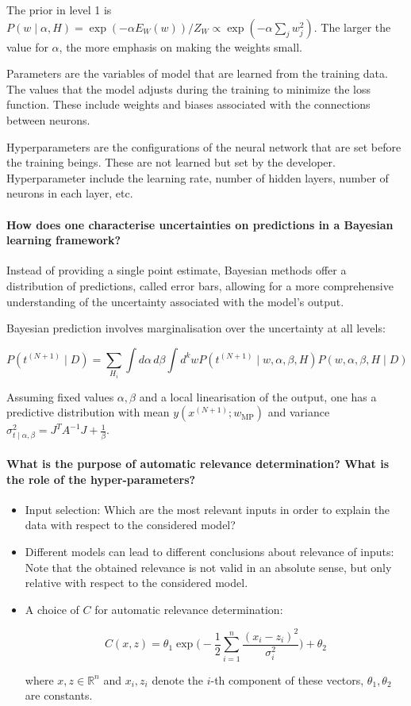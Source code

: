 The prior in level 1 is $P(w \mid \alpha, H) = \exp(- \alpha E_W(w) ) / Z_W \propto \exp(- \alpha \sum_j{w_j^2})$.
The larger the value for $\alpha$, the more emphasis on making the weights small.

Parameters are the variables of model that are learned from the training data. The values that the
model adjusts during the training to minimize the loss function. These include weights and biases
associated with the connections between neurons.

Hyperparameters are the configurations of the neural network that are set before the training beings.
These are not learned but set by the developer. Hyperparameter include the learning rate, number of
hidden layers, number of neurons in each layer, etc.

\paragraph{How does one characterise uncertainties on predictions in a Bayesian learning framework?}

Instead of providing a single point estimate, Bayesian methods offer a distribution of predictions,
called error bars, allowing for a more comprehensive understanding of the uncertainty associated with the model's output.

Bayesian prediction involves marginalisation over the uncertainty at all levels:

$$
P(t^{(N+1)} \mid D) = \sum_{H_i}{ \int{d\alpha \, d\beta \int{ d^k w P(t^{(N+1)} \mid w, \alpha, \beta, H) P(w, \alpha, \beta, H \mid D) }} }
$$

Assuming fixed values $\alpha, \beta$ and a local linearisation of the output,
one has a predictive distribution with mean $y(x^{(N+1)}; w_\text{MP})$ and variance $\sigma^2_{t \mid \alpha, \beta} = J^T A^{-1} J + \frac{1}{\beta}$.

\paragraph{What is the purpose of automatic relevance determination? What is the role of the hyper-parameters?}

\begin{itemize}
    \item Input selection: Which are the most relevant inputs in order to explain
    the data with respect to the considered model?

    \item Different models can lead to different conclusions about relevance
    of inputs: Note that the obtained relevance is not valid in an absolute
    sense, but only relative with respect to the considered model.

    \item A choice of $C$ for automatic relevance determination:

    $$C(x, z) = \theta_1 \exp\Bigg( - \frac{1}{2} \sum_{i=1}^n{\frac{(x_i - z_i)^2}{\sigma_i^2}} \Bigg) + \theta_2$$

    where $x, z \in \mathbb{R}^n$ and $x_i, z_i$ denote the $i$-th component of these vectors,
    $\theta_1, \theta_2$ are constants.
\end{itemize}

